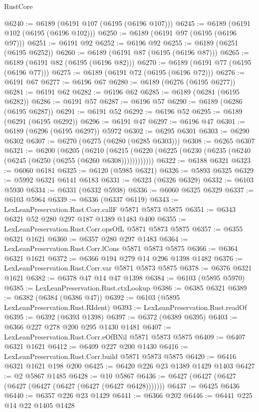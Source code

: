 \begin{lexlean}{RustCore}
\begin{coremodule}
@6240 := @6189 (@6191 @107 (@6195 (@6196 @107)))
@6245 := @6189 (@6191 @102 (@6195 (@6196 @102)))
@6250 := @6189 (@6191 @97 (@6195 (@6196 @97)))
@6251 := @6191 @92
@6252 := @6196 @92
@6255 := @6189 (@6251 (@6195 @6252))
@6260 := @6189 (@6191 @87 (@6195 (@6196 @87)))
@6265 := @6189 (@6191 @82 (@6195 (@6196 @82)))
@6270 := @6189 (@6191 @77 (@6195 (@6196 @77)))
@6275 := @6189 (@6191 @72 (@6195 (@6196 @72)))
@6276 := @6191 @67
@6277 := @6196 @67
@6280 := @6189 (@6276 (@6195 @6277))
@6281 := @6191 @62
@6282 := @6196 @62
@6285 := @6189 (@6281 (@6195 @6282))
@6286 := @6191 @57
@6287 := @6196 @57
@6290 := @6189 (@6286 (@6195 @6287))
@6291 := @6191 @52
@6292 := @6196 @52
@6295 := @6189 (@6291 (@6195 @6292))
@6296 := @6191 @47
@6297 := @6196 @47
@6301 := @6189 (@6296 (@6195 @6297)) @5972
@6302 := @6295 @6301
@6303 := @6290 @6302
@6307 := @6270 (@6275 (@6280 (@6285 @6303)))
@6308 := @6265 @6307
@6321 := @6200
    (@6205
      (@6210 (@6215 (@6220 (@6225 (@6230 (@6235 (@6240 (@6245 (@6250 (@6255 (@6260 @6308))))))))))))
@6322 := @6188 @6321
@6323 := @6060 @6181
@6325 := @6120 (@5985 @6321)
@6326 := @5893 @6325
@6329 := @5992 @6321 @6141 @6183
@6331 := @6323 (@6326 @6329)
@6332 := @6103 @5930
@6334 := @6331 (@6332 @5938)
@6336 := @6060 @6325 @6329
@6337 := @6103 @5964
@6339 := @6336 (@6337 @6119)
@6343 := LexLeanPreservation.Rust.Corr.callF @5871 @5873 @5875
@6351 := @6343 @6321 @52 @280 @297 @187 @1389 @1483 @400
@6355 := LexLeanPreservation.Rust.Corr.opsOfL @5871 @5873 @5875
@6357 := @6355 @6321 @1621
@6360 := @6357 @280 @297 @1483
@6364 := LexLeanPreservation.Rust.Corr.lCons @5871 @5873 @5875
@6366 := @6364 @6321 @1621
@6372 := @6366 @194 @279 @14 @296 @1398 @1482
@6376 := LexLeanPreservation.Rust.Corr.var @5871 @5873 @5875
@6378 := @6376 @6321 @1621
@6382 := @6378 @47 @14 @47 @1398
@6384 := @6103 (@5895 @5970)
@6385 := LexLeanPreservation.Rust.ctxLookup
@6386 := @6385 @6321
@6389 := @6382 (@6384 (@6386 @47))
@6392 := @6103 (@5895 LexLeanPreservation.Rust.RIdent)
@6393 := LexLeanPreservation.Rust.readOf
@6395 := @6392 (@6393 @1398)
@6397 := @6372 (@6389 @6395)
@6403 := @6366 @227 @278 @200 @295 @1430 @1481
@6407 := LexLeanPreservation.Rust.Corr.eOfBNil @5871 @5873 @5875
@6409 := @6407 @6321 @1621
@6412 := @6409 @227 @200 @1430
@6416 := LexLeanPreservation.Rust.Corr.build @5871 @5873 @5875
@6420 := @6416 @6321 @1621 @198 @200
@6425 := @6420 @226 @23 @1389 @1429 @1403
@6427 := @2 @5867 @1485
@6428 := @10 @5867
@6436 := @6427 (@6427 (@6427 (@6427 (@6427 (@6427 (@6427 (@6427 @6428)))))))
@6437 := @6425 @6436
@6440 := @6357 @226 @23 @1429
@6441 := @6366 @202
@6446 := @6441 @225 @14 @22 @1405 @1428

\end{coremodule}
\end{lexlean}
